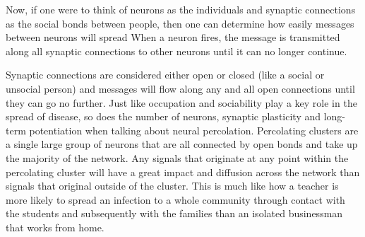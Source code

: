 	
	Now, if one were to think of neurons as the individuals and synaptic connections as the social bonds between people, then one can determine how easily	messages between neurons will spread \cite{Friedenberg2011} When a neuron fires, the message is transmitted along	all synaptic connections to other neurons until it can no longer continue.
	
	 Synaptic connections are	considered either open or closed (like a social or unsocial person) and messages will flow along	any and all open connections until they can go no further. Just like occupation and sociability play	a key role in the spread of disease, so does the number of neurons, synaptic plasticity \cite{Hughes1958} and	long-term potentiation when talking about neural percolation. Percolating clusters are a single large	group of neurons that are all connected by open bonds and take up the majority of the network.	Any signals that originate at any point within the percolating cluster will have a great impact and	diffusion across the network than signals that original outside of the cluster.
	  This is much like	how a teacher is more likely to spread an infection to a whole community through contact with the	students and subsequently with the families than an isolated businessman that works from home.
	
	

